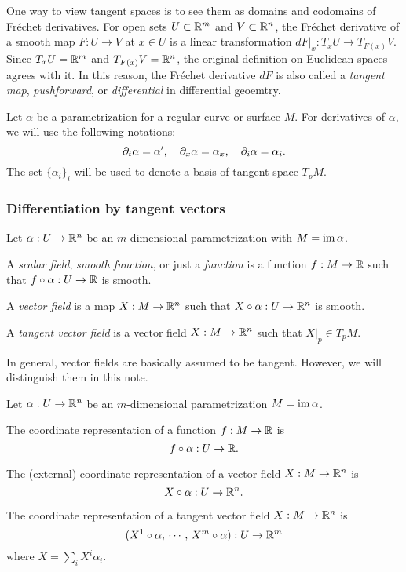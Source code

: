 \documentclass{../exp}
\def\a{\alpha}
\begin{document}
\begin{rmk}
One way to view tangent spaces is to see them as domains and codomains of Fr\'echet derivatives.
For open sets $U\subset\mathbb{R}^m$ and $V\subset\mathbb{R}^n$, the Fr\'echet derivative of a smooth map $F:U\to V$ at $x\in U$ is a linear transformation $dF|_x:T_xU\to T_{F(x)}V$.
Since $T_xU=\mathbb{R}^m$ and $T_{F(x)}V=\mathbb{R}^n$, the original definition on Euclidean spaces agrees with it.
In this reason, the Fr\'echet derivative $dF$ is also called a \emph{tangent map}, \emph{pushforward}, or \emph{differential} in differential geoemtry.
\end{rmk}


\begin{notn*}
Let $\a$ be a parametrization for a regular curve or surface $M$.
For derivatives of $\a$, we will use the following notations:
\[\pd_t\a=\a',\quad\pd_x\a=\a_x,\quad\pd_i\a=\a_i.\]
The set $\{\a_i\}_i$ will be used to denote a basis of tangent space $T_pM$.
\end{notn*}





\subsubsection{Differentiation by tangent vectors}
\begin{defn}
Let $\a:U\to\R^n$ be an $m$-dimensional parametrization with $M=\im\a$.
\begin{cond}
\item A \emph{scalar field}, \emph{smooth function}, or just a \emph{function} is a function $f:M\to\R$ such that $f\o\a:U\to\R$ is smooth.
\item A \emph{vector field} is a map $X:M\to\R^n$ such that $X\o\a:U\to\R^n$ is smooth.
\item A \emph{tangent vector field} is a vector field $X:M\to\R^n$ such that $X|_p\in T_pM$.
\end{cond}
In general, vector fields are basically assumed to be tangent. However, we will distinguish them in this note.
\end{defn}

\begin{defn}
Let $\a:U\to\R^n$ be an $m$-dimensional parametrization $M=\im\a$.
\begin{cond}
\item The coordinate representation of a function $f:M\to\R$ is
\[f\o\a:U\to\R.\]
\item The (external) coordinate representation of a vector field $X:M\to\R^n$ is
\[X\o\a:U\to\R^n.\]
\item The coordinate representation of a tangent vector field $X:M\to\R^n$ is
\[(X^1\o\a,\,\cdots,\,X^m\o\a):U\to\R^m\]
where $X=\sum_iX^i\a_i$.
\end{cond}
\end{defn}
\end{document}
